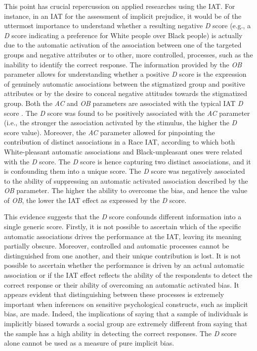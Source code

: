 \documentclass[12pt]{book}
\begin{document}
This point has crucial repercussion on applied researches using the IAT.
For instance, in an IAT for the assessment of implicit prejudice, it would be of the uttermost importance to understand whether a resulting negative \emph{D} score (e.g., a \emph{D} score indicating a preference for White people over Black people) is actually due to the automatic activation of the association between one of the targeted groups and negative attributes or to other, more controlled, processes, such as the inability to identify the correct response.  
The information provided by the \emph{OB} parameter allows for understanding whether a positive \emph{D} score is the expression of genuinely automatic associations between the stigmatized group and positive attributes or by the desire to conceal negative attitudes towards the stigmatized group.
Both the \emph{AC} and \emph{OB} parameters are associated with the typical IAT \emph{D} score \cite{Conrey2005}.
The \emph{D} score was found to be positively associated with the \emph{AC} parameter (i.e., the stronger the association activated by the stimulus, the higher the \emph{D} score value). 
Moreover, the \emph{AC} parameter allowed for pinpointing the contribution of distinct associations in a Race IAT, according to which both White-pleasant automatic associations and Black-unpleasant ones were related with the \emph{D} score. The \emph{D} score is hence capturing two distinct associations, and it is confounding them into a unique score. 
The \emph{D} score was negatively associated to the ability of suppressing an automatic activated association described by the \emph{OB} parameter. The higher the ability to overcome the bias, and hence the value of \emph{OB}, the lower the IAT effect as expressed by the \emph{D} score.

This evidence suggests that the \emph{D} score confounds different information into a single generic score. Firstly, it is not possible to ascertain which of the specific automatic associations drives the performance at the IAT, leaving its meaning partially obscure. 
Moreover, controlled and automatic processes cannot be distinguished from one another, and their unique contribution is lost. It is not possible to ascertain whether the performance is driven by an actual automatic association or if the IAT effect reflects the ability of the respondents to detect the correct response or their ability of overcoming an automatic activated bias. 
It appears evident that distinguishing between these processes is extremely important when inferences on sensitive psychological constructs, such as implicit bias, are made. Indeed, the implications of saying that a sample of individuals is implicitly biased towards a social group are extremely different from saying that the sample has a high ability in detecting the correct responses.
The \emph{D} score alone cannot be used as a measure of pure implicit bias.
\end{document}
